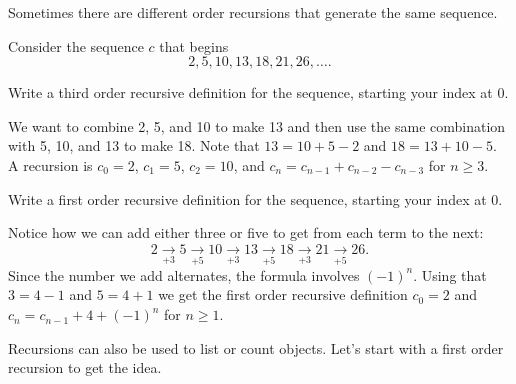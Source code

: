 Sometimes there are different order recursions that generate the same sequence.

\begin{exam}
\label{exam_diff_order_rec}
    Consider the sequence $c$ that begins $$2, 5, 10, 13, 18, 21, 26, \ldots.$$ 
        \begin{apart}
            \item Write a third order recursive definition for the sequence, starting your index at 0.
                \begin{soln}
                   We want to combine 2, 5, and 10 to make 13 and then use the same combination with 5, 10, and 13 to make 18.  Note that $13 = 10 + 5-2$ and $18 = 13 + 10 -5$.  A recursion is $c_0=2$, $c_1=5$, $c_2=10$, and $c_n=c_{n-1}+c_{n-2}-c_{n-3}$ for $n \ge 3$.
                \end{soln}
            \item Write a first order recursive definition for the sequence, starting your index at 0.
                \begin{soln}
                    Notice how we can add either three or five to get from each term to the next:
                        $$2 \xrightarrow[+ 3]{} 5 \xrightarrow[+ 5]{} 10 \xrightarrow[+ 3]{} 13 \xrightarrow[+ 5]{} 18 \xrightarrow[+ 3]{} 21 \xrightarrow[+ 5]{} 26.$$
                    Since the number we add alternates, the formula involves $(-1)^n$.  Using that $3 = 4-1$ and $5 = 4+1$ we get the first order recursive definition $c_0=2$ and $c_n=c_{n-1}+4+(-1)^n$ for $n \ge 1$.
                \end{soln}
        \end{apart}
\end{exam}

Recursions can also be used to list or count objects.  Let's start with a first order recursion to get the idea.

